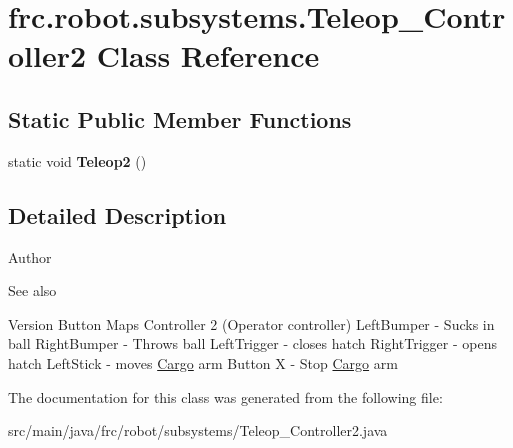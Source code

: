 \hypertarget{classfrc_1_1robot_1_1subsystems_1_1_teleop___controller2}{}\section{frc.\+robot.\+subsystems.\+Teleop\+\_\+\+Controller2 Class Reference}
\label{classfrc_1_1robot_1_1subsystems_1_1_teleop___controller2}
\subsection*{Static Public Member Functions}
\begin{DoxyCompactItemize}
\item 
\mbox{\label{classfrc_1_1robot_1_1subsystems_1_1_teleop___controller2_a2943912b4181f00e084af67a56f6837f}} 
static void {\bfseries Teleop2} ()
\end{DoxyCompactItemize}


\subsection{Detailed Description}
\begin{DoxyAuthor}{Author}

\end{DoxyAuthor}
\begin{DoxySeeAlso}{See also}

\end{DoxySeeAlso}
\begin{DoxyVersion}{Version}
Button Maps Controller 2 (Operator controller) Left\+Bumper -\/ Sucks in ball Right\+Bumper -\/ Throws ball Left\+Trigger -\/ closes hatch Right\+Trigger -\/ opens hatch Left\+Stick -\/ moves \hyperlink{classfrc_1_1robot_1_1subsystems_1_1_cargo}{Cargo} arm Button X -\/ Stop \hyperlink{classfrc_1_1robot_1_1subsystems_1_1_cargo}{Cargo} arm 
\end{DoxyVersion}


The documentation for this class was generated from the following file\+:\begin{DoxyCompactItemize}
\item 
src/main/java/frc/robot/subsystems/Teleop\+\_\+\+Controller2.\+java\end{DoxyCompactItemize}

